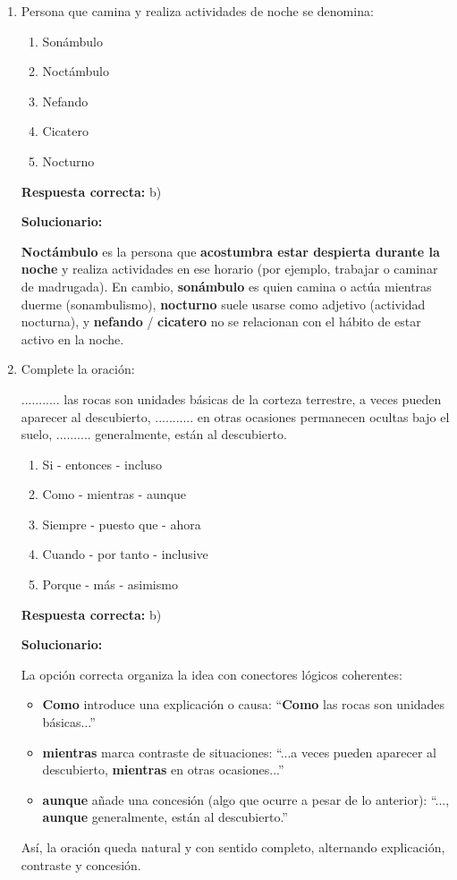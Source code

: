 \begin{enumerate}[resume]

\item Persona que camina y realiza actividades de noche se denomina:
\begin{enumerate}[label=\alph*)]
	\item Sonámbulo
	\item Noctámbulo
	\item Nefando
	\item Cicatero
	\item Nocturno
\end{enumerate}

\textbf{Respuesta correcta:} b)

\vspace{2mm}
\textbf{Solucionario:}

\textbf{Noctámbulo} es la persona que \textbf{acostumbra estar despierta durante la noche} y realiza actividades en ese horario (por ejemplo, trabajar o caminar de madrugada). 
En cambio, \textbf{sonámbulo} es quien camina o actúa mientras duerme (sonambulismo), \textbf{nocturno} suele usarse como adjetivo (actividad nocturna), y \textbf{nefando} / \textbf{cicatero} no se relacionan con el hábito de estar activo en la noche.

\item Complete la oración:

........... las rocas son unidades básicas de la corteza terrestre, a veces pueden aparecer al descubierto, ........... en otras ocasiones permanecen ocultas bajo el suelo, .......... generalmente, están al descubierto.

\begin{enumerate}[label=\alph*)]
	\item Si - entonces - incluso
	\item Como - mientras - aunque
	\item Siempre - puesto que - ahora
	\item Cuando - por tanto - inclusive
	\item Porque - más - asimismo
\end{enumerate}

\textbf{Respuesta correcta:} b)

\vspace{2mm}
\textbf{Solucionario:}

La opción correcta organiza la idea con conectores lógicos coherentes:
\begin{itemize}
	\item \textbf{Como} introduce una explicación o causa: “\textbf{Como} las rocas son unidades básicas...”
	\item \textbf{mientras} marca contraste de situaciones: “...a veces pueden aparecer al descubierto, \textbf{mientras} en otras ocasiones...”
	\item \textbf{aunque} añade una concesión (algo que ocurre a pesar de lo anterior): “..., \textbf{aunque} generalmente, están al descubierto.”
\end{itemize}
Así, la oración queda natural y con sentido completo, alternando explicación, contraste y concesión.


\end{enumerate}
